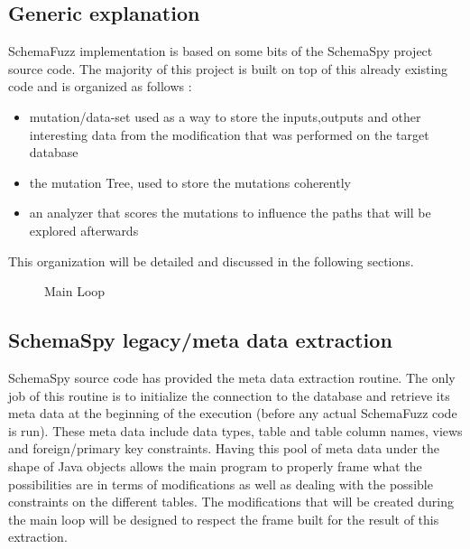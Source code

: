 \documentclass{article}
\begin{document}
\begin{empfile}
		\subsection{Generic explanation}
SchemaFuzz implementation is based on some bits of the SchemaSpy project source code.
The majority of this project is built on top of this already existing code and is organized as follows :
		\begin{itemize}
		\item{mutation/data-set used as a way to store the inputs,outputs and other interesting data from the modification that was performed on the target database}
		\item{the mutation Tree, used to store the mutations coherently}
		\item{an analyzer that scores the mutations to influence the paths that will be explored afterwards}
		\end{itemize}
This organization will be detailed and discussed in the following sections.

		 \clearpage
\begin{figure} [h!]
\centering

\caption{Main Loop}
\end{figure}
		 \clearpage		 
		 
		\subsection{SchemaSpy legacy/meta data extraction}
SchemaSpy source code has provided the meta data extraction routine. The only job of this routine is to initialize the connection to the database and retrieve its meta data at the   beginning of the execution (before any actual SchemaFuzz code is run). These meta data include data types, table and table column names, views and foreign/primary key constraints. Having this pool of meta data under the shape of Java objects allows the main program to properly frame what the possibilities are in terms of modifications as well as dealing with the possible constraints on the different tables. The modifications that will be created during the main loop will be designed to respect the frame built for the result of this extraction.


\end{empfile}
\end{document}
